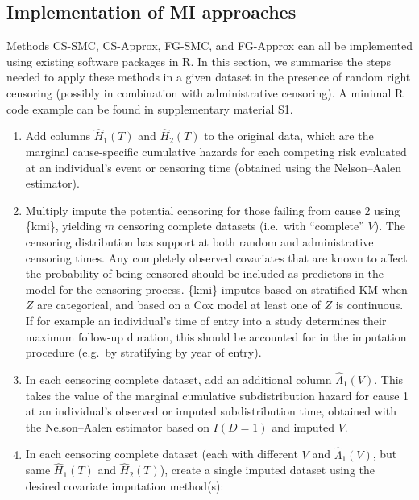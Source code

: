 \documentclass[
  letterpaper,
  paper=240mm:170mm,
  twoside=true,
  open=right,
  fontsize=10pt,
  pagesize=false,
  BCOR=15mm,
  DIV=14,
  headinclude=true,
  footinclude=false,
  headsepline=on]{scrbook}
\begin{document}
\subsection{Implementation of MI
approaches}\label{implementation-of-mi-approaches}

Methods CS-SMC, CS-Approx, FG-SMC, and FG-Approx can all be implemented
using existing software packages in R. In this section, we summarise the
steps needed to apply these methods in a given dataset in the presence
of random right censoring (possibly in combination with administrative
censoring). A minimal R code example can be found in supplementary
material S1.

\begin{enumerate}
\def\labelenumi{\arabic{enumi}.}
\item
  Add columns \(\hat{H}_1(T)\) and \(\hat{H}_2(T)\) to the original
  data, which are the marginal cause-specific cumulative hazards for
  each competing risk evaluated at an individual's event or censoring
  time (obtained using the Nelson--Aalen estimator).
\item
  Multiply impute the potential censoring for those failing from cause 2
  using \{kmi\}, yielding \(m\) censoring complete datasets (i.e.~with
  ``complete'' \(V\)). The censoring distribution has support at both
  random and administrative censoring times. Any completely observed
  covariates that are known to affect the probability of being censored
  should be included as predictors in the model for the censoring
  process. \{kmi\} imputes based on stratified KM when \(Z\) are
  categorical, and based on a Cox model at least one of \(Z\) is
  continuous. If for example an individual's time of entry into a study
  determines their maximum follow-up duration, this should be accounted
  for in the imputation procedure (e.g.~by stratifying by year of
  entry).
\item
  In each censoring complete dataset, add an additional column
  \(\hat{\Lambda}_1(V)\). This takes the value of the marginal
  cumulative subdistribution hazard for cause 1 at an individual's
  observed or imputed subdistribution time, obtained with the
  Nelson--Aalen estimator based on \(I(D = 1)\) and imputed \(V\).
\item
  In each censoring complete dataset (each with different \(V\) and
  \(\hat{\Lambda}_1(V)\), but same \(\hat{H}_1(T)\) and
  \(\hat{H}_2(T)\)), create a single imputed dataset using the desired
  covariate imputation method(s):


\end{enumerate}
\end{document}
